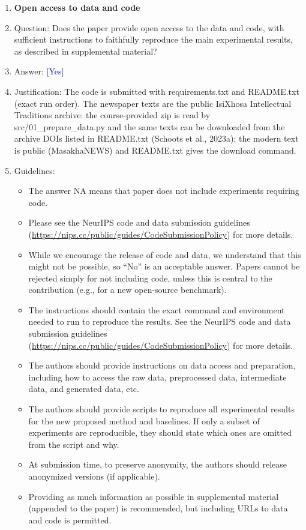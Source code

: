 \documentclass[10pt,letterpaper]{article}
\newcommand{\answerYes}[1][]{\textcolor{blue}{[Yes] #1}}
\begin{document}
\begin{enumerate}
\item {\bf Open access to data and code}
    \item[] Question: Does the paper provide open access to the data and code, with sufficient instructions to faithfully reproduce the main experimental results, as described in supplemental material?
    \item[] Answer: \answerYes{}
    \item[] Justification: The code is submitted with requirements.txt and README.txt (exact run order). The newspaper texts are the public IsiXhosa Intellectual Traditions archive: the course-provided zip is read by src/01\_prepare\_data.py and the same texts can be downloaded from the archive DOIs listed in README.txt (Schoots et al., 2023a); the modern text is public (MasakhaNEWS) and README.txt gives the download command.
    \item[] Guidelines:
    \begin{itemize}
        \item The answer NA means that paper does not include experiments requiring code.
        \item Please see the NeurIPS code and data submission guidelines (\url{https://nips.cc/public/guides/CodeSubmissionPolicy}) for more details.
        \item While we encourage the release of code and data, we understand that this might not be possible, so “No” is an acceptable answer. Papers cannot be rejected simply for not including code, unless this is central to the contribution (e.g., for a new open-source benchmark).
        \item The instructions should contain the exact command and environment needed to run to reproduce the results. See the NeurIPS code and data submission guidelines (\url{https://nips.cc/public/guides/CodeSubmissionPolicy}) for more details.
        \item The authors should provide instructions on data access and preparation, including how to access the raw data, preprocessed data, intermediate data, and generated data, etc.
        \item The authors should provide scripts to reproduce all experimental results for the new proposed method and baselines. If only a subset of experiments are reproducible, they should state which ones are omitted from the script and why.
        \item At submission time, to preserve anonymity, the authors should release anonymized versions (if applicable).
        \item Providing as much information as possible in supplemental material (appended to the paper) is recommended, but including URLs to data and code is permitted.
    \end{itemize}



\end{enumerate}
\end{document}
